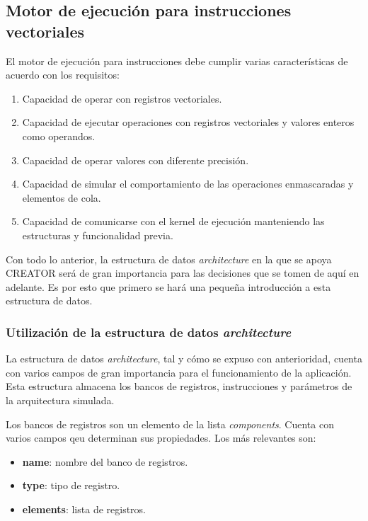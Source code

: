 \subsection{Motor de ejecución para instrucciones vectoriales}\label{sec:motor}

El motor de ejecución para instrucciones debe cumplir varias características de acuerdo con los requisitos:

\begin{enumerate}
\item Capacidad de operar con registros vectoriales.
\item Capacidad de ejecutar operaciones con registros vectoriales y valores enteros como operandos.
\item Capacidad de operar valores con diferente precisión.
\item Capacidad de simular el comportamiento de las operaciones enmascaradas y elementos de cola.
\item Capacidad de comunicarse con el kernel de ejecución manteniendo las estructuras y funcionalidad previa.
\end{enumerate}

Con todo lo anterior, la estructura de datos \textit{architecture} en la que se apoya CREATOR será de gran importancia para las decisiones que se tomen de aquí en adelante. Es por esto que primero se hará una pequeña introducción a esta estructura de datos.

\subsubsection{Utilización de la estructura de datos \textit{architecture}}

La estructura de datos \textit{architecture}, tal y cómo se expuso con
anterioridad, cuenta con varios campos de gran importancia para el
funcionamiento de la aplicación. Esta estructura almacena los bancos de
registros, instrucciones y parámetros de la arquitectura simulada.

Los bancos de registros son un elemento de la lista \textit{components}. Cuenta con varios campos qeu determinan sus propiedades. Los más relevantes son:
\begin{itemize}
\item \textbf{name}: nombre del banco de registros.
\item \textbf{type}: tipo de registro.
\item \textbf{elements}: lista de registros.
\end{itemize}


